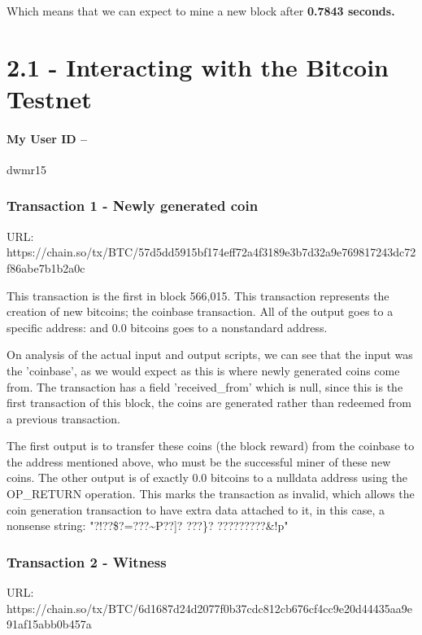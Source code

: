 \documentclass[11pt]{article}
\begin{document}
	Which means that we can expect to mine a new block after \textbf{0.7843 seconds.}
	\newpage
	
	
	\section*{2.1 - Interacting with the Bitcoin Testnet}
	\paragraph{My User ID -- } dwmr15
	
	\subsubsection*{Transaction 1 - Newly generated coin}
	URL: https://chain.so/tx/BTC/57d5dd5915bf174eff72a4f3189e3b7d32a9e769817243dc72f86abe7b1b2a0c \newline
	
	This transaction is the first in block 566,015. This transaction represents the creation of new bitcoins; the coinbase transaction. All of the output goes to a specific address:  and 0.0 bitcoins goes to a nonstandard address.
	
	On analysis of the actual input and output scripts, we can see that the input was the 'coinbase', as we would expect as this is where newly generated coins come from. The transaction has a field 'received\_from' which is null, since this is the first transaction of this block, the coins are generated rather than redeemed from a previous transaction. 
	
	The first output is to transfer these coins (the block reward) from the coinbase to the address mentioned above, who must be the successful miner of these new coins. The other output is of exactly 0.0 bitcoins to a nulldata address using the OP\_RETURN operation. This marks the transaction as invalid, which allows the coin generation transaction to have extra data attached to it, in this case, a nonsense string: "?!??\$?=???\textasciitilde P??]? ???\}? ?????????\&!p"
	
	
	\subsubsection*{Transaction 2 - Witness}
	URL: https://chain.so/tx/BTC/6d1687d24d2077f0b37cdc812cb676cf4cc9e20d44435aa9e91af15abb0b457a \newline
	
\end{document}

